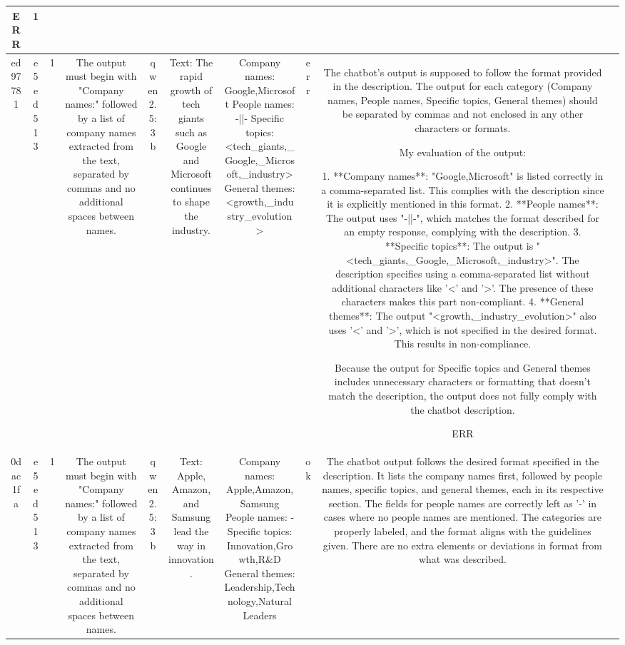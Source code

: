 \begin{table}[h!]
\begin{tabular}{|c|c|c|c|c|c|c|c|c|c|}
ERR & 1\\
\hline
ed97781 & e5ed513 & 1 & The output must begin with "Company names:" followed by a list of company names extracted from the text, separated by commas and no additional spaces between names. & qwen2.5:3b & Text: The rapid growth of tech giants such as Google and Microsoft continues to shape the industry. & Company names: Google,Microsoft
People names: -||-
Specific topics: <tech_giants,_Google,_Microsoft,_industry>
General themes: <growth,_industry_evolution> & err & The chatbot's output is supposed to follow the format provided in the description. The output for each category (Company names, People names, Specific topics, General themes) should be separated by commas and not enclosed in any other characters or formats.

My evaluation of the output:

1. **Company names**: "Google,Microsoft" is listed correctly in a comma-separated list. This complies with the description since it is explicitly mentioned in this format.
2. **People names**: The output uses "-||-", which matches the format described for an empty response, complying with the description.
3. **Specific topics**: The output is "<tech_giants,_Google,_Microsoft,_industry>". The description specifies using a comma-separated list without additional characters like '<' and '>'. The presence of these characters makes this part non-compliant.
4. **General themes**: The output "<growth,_industry_evolution>" also uses '<' and '>', which is not specified in the desired format. This results in non-compliance.

Because the output for Specific topics and General themes includes unnecessary characters or formatting that doesn't match the description, the output does not fully comply with the chatbot description.

ERR & \\
\hline
0dac1fa & e5ed513 & 1 & The output must begin with "Company names:" followed by a list of company names extracted from the text, separated by commas and no additional spaces between names. & qwen2.5:3b & Text: Apple, Amazon, and Samsung lead the way in innovation. & Company names: Apple,Amazon,Samsung
People names: -
Specific topics: Innovation,Growth,R\&D
General themes: Leadership,Technology,Natural Leaders & ok & The chatbot output follows the desired format specified in the description. It lists the company names first, followed by people names, specific topics, and general themes, each in its respective section. The fields for people names are correctly left as '-' in cases where no people names are mentioned. The categories are properly labeled, and the format aligns with the guidelines given. There are no extra elements or deviations in format from what was described.


\end{tabular}
\end{table}
